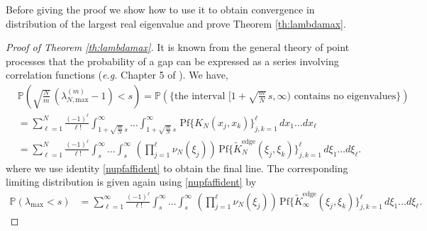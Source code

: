 \documentclass[11pt,reqno]{amsproc}
\numberwithin{equation}{section}
\numberwithin{theorem}{section}
\begin{document}
Before giving the proof we show how to use it to obtain convergence in distribution of the largest real eigenvalue and prove Theorem \ref{th:lambdamax}.
\begin{proof}[Proof of Theorem \ref{th:lambdamax}]
It is known from the general theory of point processes that the probability of a gap can be expressed as a series involving correlation functions (\textit{e.g.} Chapter 5 of \cite{DVJ88}). We have,
\begin{align}
& \mathbb{P}\left(\sqrt{\frac{N}{m}}\,\left(\lambda^{(m)}_{N,\mathrm{max}}-1\right) < s\right) = \mathbb{P}\left(\bigg\{\textrm{the interval}\,\, [1+\sqrt{\frac{m}{N}}\,s,\infty) \,\,\textrm{contains no eigenvalues}\bigg\}\right)\\
 &=\sum_{\ell=1}^{N}\frac{(-1)^{\ell}}{\ell!}\int_{1+\sqrt{\frac{m}{N}}\,s}^{\infty}\ldots \int_{1+\sqrt{\frac{m}{N}}\,s}^{\infty}\,\mathrm{Pf}\bigg\{K_{N}(x_{j},x_{k})\bigg\}_{j,k=1}^{\ell}\,dx_{1}\ldots dx_{\ell}\\
&=\sum_{\ell=1}^{N}\frac{(-1)^{\ell}}{\ell!}\int_{s}^{\infty}\ldots \int_{s}^{\infty}\,\left(\prod_{j=1}^{\ell}\nu_{N}(\xi_j)\right)\,\mathrm{Pf}\bigg\{\tilde{K}^{\mathrm{edge}}_{N}(\xi_{j},\xi_{k})\bigg\}_{j,k=1}^{\ell}\,d\xi_{1}\ldots d\xi_{\ell}.
\end{align}
where we use identity \eqref{nupfaffident} to obtain the final line. The corresponding limiting distribution is given again using \eqref{nupfaffident} by
\begin{align}
\mathbb{P}\left(\lambda_{\mathrm{max}} < s\right) 
&=\sum_{\ell=1}^{\infty}\frac{(-1)^{\ell}}{\ell!}\int_{s}^{\infty}\ldots \int_{s}^{\infty}\,\left(\prod_{j=1}^{\ell}\nu_{N}(\xi_j)\right)\,\mathrm{Pf}\bigg\{\tilde{K}_{\infty}^{\mathrm{edge}}(\xi_{j},\xi_{k})\bigg\}_{j,k=1}^{\ell}\,d\xi_{1}\ldots d\xi_{\ell}.\label{limitpfaff}
\end{align}



\end{proof}
\end{document}
